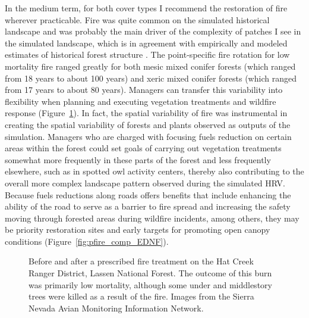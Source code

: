 In the medium term, for both cover types I recommend the restoration of fire wherever practicable. Fire was quite common on the simulated historical landscape and was probably the main driver of the complexity of patches I see in the simulated landscape, which is in agreement with empirically and modeled estimates of historical forest structure \citep{Franklin2002,Nonaka2005,Mallek2013}. The point-specific fire rotation for low mortality fire ranged greatly for both mesic mixed conifer forests (which ranged from 18 years to about 100 years) and xeric mixed conifer forests (which ranged from 17 years to about 80 years). Managers can transfer this variability into flexibility when planning and executing vegetation treatments and wildfire response (Figure~\ref{fig:pfire_comp_HCRD}). In fact, the spatial variability of fire was instrumental in creating the spatial variability of forests and plants observed as outputs of the simulation. Managers who are charged with focusing fuels reduction on certain areas within the forest could set goals of carrying out vegetation treatments somewhat more frequently in these parts of the forest and less frequently elsewhere, such as in spotted owl activity centers, thereby also contributing to the overall more complex landscape pattern observed during the simulated HRV. Because fuels reductions along roads offers benefits that include enhancing the ability of the road to serve as a barrier to fire spread and increasing the safety moving through forested areas during wildfire incidents, among others, they may be priority restoration sites and early targets for promoting open canopy conditions (Figure~\ref{fig:pfire_comp_EDNF}). 

\begin{figure}[!htbp]
  \centering
  \caption{Before and after a prescribed fire treatment on the Hat Creek Ranger District, Lassen National Forest. The outcome of this burn was primarily low mortality, although some under and middlestory trees were killed as a result of the fire. Images from the Sierra Nevada Avian Monitoring Information Network.} 
  \label{fig:pfire_comp_HCRD}
\end{figure}

